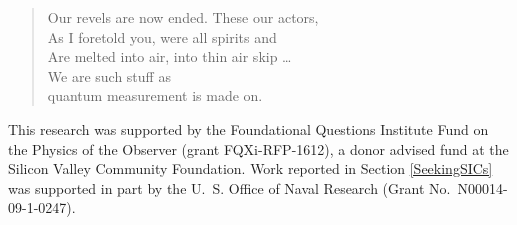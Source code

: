 \documentclass[aps,pra,superscriptaddress,12pt,tightenlines,nofootinbib]{revtex4-2}
\begin{document}
\begin{flushright}
\baselineskip=13pt
\parbox{3.4in}{
\begin{verse}
Our revels are now ended.  These our actors, \\
As I foretold you, were all spirits and \\
Are melted into air, into thin air skip \ldots \\
We are such stuff as \\
\hspace*{0.5cm} quantum measurement is made on.
\end{verse}}
\end{flushright}

\vfill

\acknowledgments

This research was supported by the Foundational Questions Institute Fund on the Physics of the Observer (grant FQXi-RFP-1612), a donor advised fund at the Silicon Valley Community Foundation.  Work reported in Section \ref{SeekingSICs} was supported in part by the U.~S. Office of Naval Research (Grant No.\ N00014-09-1-0247).  




\end{document}
